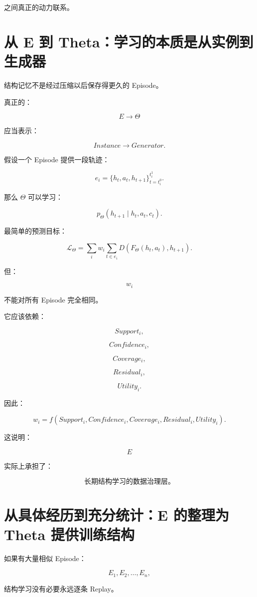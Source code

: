 之间真正的动力联系。


\section{从 E 到 Theta：学习的本质是从实例到生成器}

结构记忆不是经过压缩以后保存得更久的 Episode。

真正的：

\[
E\rightarrow\Theta
\]

应当表示：

\[
\boxed{
Instance
\rightarrow
Generator.
}
\]

假设一个 Episode 提供一段轨迹：

\[
e_i
=
\{
h_t,
a_t,
h_{t+1}
\}_{t=t_i^0}^{t_i^1}.
\]

那么 \(\Theta\) 可以学习：

\[
\boxed{
p_{\Theta}
(
h_{t+1}
\mid
h_t,a_t,c_t
).
}
\]

最简单的预测目标：

\[
\mathcal L_{\Theta}
=
\sum_i
w_i
\sum_{t\in e_i}
D
\left(
F_{\Theta}(h_t,a_t),
h_{t+1}
\right).
\]

但：

\[
w_i
\]

不能对所有 Episode 完全相同。

它应该依赖：

\[
Support_i,
\]

\[
Confidence_i,
\]

\[
Coverage_i,
\]

\[
Residual_i,
\]

\[
Utility_i.
\]

因此：

\[
\boxed{
w_i
=
f(
Support_i,
Confidence_i,
Coverage_i,
Residual_i,
Utility_i
).
}
\]

这说明：

\[
\boxed{
E
}
\]

实际上承担了：

\[
\boxed{
\text{长期结构学习的数据治理层。}
}
\]


\section{从具体经历到充分统计：E 的整理为 Theta 提供训练结构}

如果有大量相似 Episode：

\[
E_1,E_2,\ldots,E_n,
\]

结构学习没有必要永远逐条 Replay。

